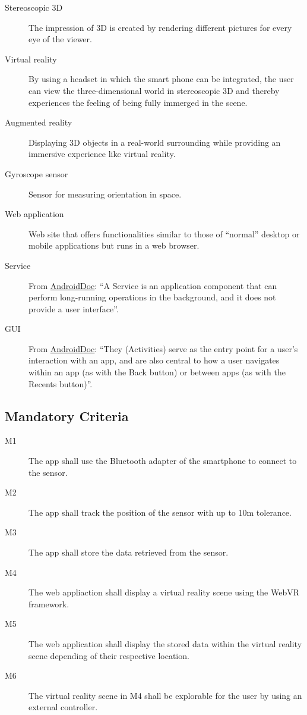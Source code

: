 \begin{description}
	\item[Stereoscopic 3D] The impression of 3D is created by rendering different pictures for every eye of the viewer.
	\item[Virtual reality] By using a headset in which the smart phone can be integrated, the user can view the three-dimensional world in stereoscopic 3D and thereby experiences the feeling of being fully immerged in the scene.
	\item[Augmented reality] Displaying 3D objects in a real-world surrounding while providing an immersive experience like virtual reality.
	\item[Gyroscope sensor] Sensor for measuring orientation in space.
	\item[Web application] Web site that offers functionalities similar to those of ``normal'' desktop or mobile applications but runs in a web browser.
	\item[Service] From \href{https://developer.android.com/guide/components/services.html}{AndroidDoc}: ``A Service is an application component that can perform long-running operations in the background, and it does not provide a user interface''.
	\item[GUI] From \href{https://developer.android.com/guide/components/activities.html}{AndroidDoc}: ``They (Activities) serve as the entry point for a user's interaction with an app, and are also central to how a user navigates within an app (as with the Back button) or between apps (as with the Recents button)''.
\end{description}

\bigskip

\subsection{Mandatory Criteria}

\begin{description}
	\item[M1] The app shall use the Bluetooth adapter of the smartphone to connect to the sensor.
	\item[M2] The app shall track the position of the sensor with up to 10m tolerance.
	\item[M3] The app shall store the data retrieved from the sensor.
	\item[M4] The web appliaction shall display a virtual reality scene using the WebVR framework.
	\item[M5] The web application shall display the stored data within the virtual reality scene depending of their respective location.
	\item[M6] The virtual reality scene in M4 shall be explorable for the user by using an external controller.
	
\end{description}

